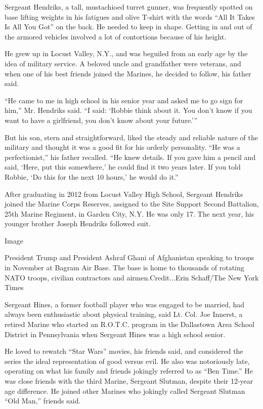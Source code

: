 Sergeant Hendriks, a tall, mustachioed turret gunner, was frequently
spotted on base lifting weights in his fatigues and olive T-shirt with
the words ``All It Takes Is All You Got'' on the back. He needed to keep
in shape. Getting in and out of the armored vehicles involved a lot of
contortions because of his height.

He grew up in Locust Valley, N.Y., and was beguiled from an early age by
the idea of military service. A beloved uncle and grandfather were
veterans, and when one of his best friends joined the Marines, he
decided to follow, his father said.

``He came to me in high school in his senior year and asked me to go
sign for him,'' Mr. Hendriks said. ``I said: `Robbie think about it. You
don't know if you want to have a girlfriend, you don't know about your
future.'''

But his son, stern and straightforward, liked the steady and reliable
nature of the military and thought it was a good fit for his orderly
personality. ``He was a perfectionist,'' his father recalled. ``He knew
details. If you gave him a pencil and said, `Here, put this somewhere,'
he could find it two years later. If you told Robbie, `Do this for the
next 10 hours,' he would do it.''

After graduating in 2012 from Locust Valley High School, Sergeant
Hendriks joined the Marine Corps Reserves, assigned to the Site Support
Second Battalion, 25th Marine Regiment, in Garden City, N.Y. He was only
17. The next year, his younger brother Joseph Hendriks followed suit.

Image

President Trump and President Ashraf Ghani of Afghanistan speaking to
troops in November at Bagram Air Base. The base is home to thousands of
rotating NATO troops, civilian contractors and airmen.Credit...Erin
Schaff/The New York Times

Sergeant Hines, a former football player who was engaged to be married,
had always been enthusiastic about physical training, said Lt. Col. Joe
Innerst, a retired Marine who started an R.O.T.C. program in the
Dallastown Area School District in Pennsylvania when Sergeant Hines was
a high school senior.

He loved to rewatch ``Star Wars'' movies, his friends said, and
considered the series the ideal representation of good versus evil. He
also was notoriously late, operating on what his family and friends
jokingly referred to as ``Ben Time.'' He was close friends with the
third Marine, Sergeant Slutman, despite their 12-year age difference. He
joined other Marines who jokingly called Sergeant Slutman ``Old Man,''
friends said.

